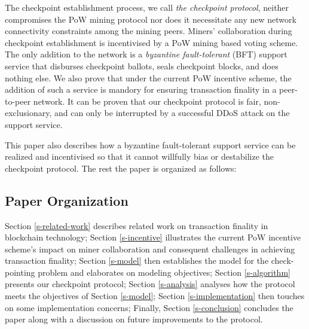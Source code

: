 The checkpoint establishment process, we call \textit{the checkpoint protocol}, neither compromises the PoW mining protocol nor does it necessitate any new network connectivity constraints among the mining peers. Miners' collaboration during checkpoint establishment is incentivised by a PoW mining based voting scheme. The only addition to the network is a \textit{byzantine fault-tolerant} (BFT) \cite{Lamport:1982:BGP:357172.357176} support service that disburses checkpoint ballots, seals checkpoint blocks, and does nothing else. We also prove that under the current PoW incentive scheme, the addition of such a service is mandory for ensuring transaction finality in a peer-to-peer network. It can be proven that our checkpoint protocol is fair, non-exclusionary, and can only be interrupted by a successful DDoS attack \cite{Yu:2013:DDS:2556385} on the support service.          

This paper also describes how a byzantine fault-tolerant support service can be realized and incentivised so that it cannot willfully bias or destabilize the checkpoint protocol. The rest the paper is organized as follows:

\subsection{Paper Organization}
Section \ref{s-related-work} describes related work on transaction finality in blockchain technology; Section \ref{s-incentive} illustrates the current PoW incentive scheme's impact on miner collaboration and consequent challenges in achieving transaction finality; Section \ref{s-model} then establishes the model for the check-pointing problem and elaborates on modeling objectives; Section \ref{s-algorithm} presents our checkpoint protocol; Section \ref{s-analysis} analyses how the protocol meets the objectives of Section \ref{s-model}; Section \ref{s-implementation} then touches on some implementation concerns; Finally, Section \ref{s-conclusion} concludes the paper along with a discussion on future improvements to the protocol.  
